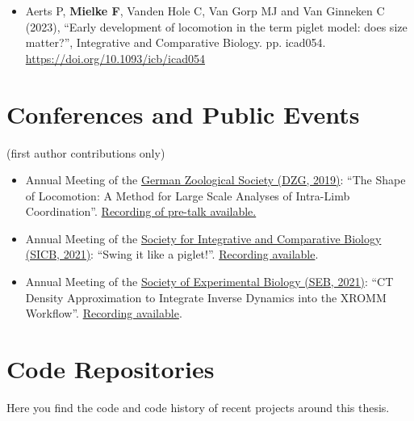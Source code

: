 \begin{change}
\begin{itemize}
\item Aerts P, \textbf{Mielke F}, Vanden Hole C, Van Gorp MJ and Van Ginneken C (2023), ``Early development of locomotion in the term piglet model: does size matter?'', Integrative and Comparative Biology. pp. icad054. \url{https://doi.org/10.1093/icb/icad054}
\end{itemize}
\section{Conferences and Public Events}
\label{sec:orga23c631}
(first author contributions only)

\begin{itemize}
\item Annual Meeting of the \href{https://www.dzg-ev.de/veranstaltungen/jahrestagungen}{German Zoological Society (DZG, 2019)}: ``The Shape of Locomotion: A Method for Large Scale Analyses of Intra-Limb Coordination''. \href{http://mielke-bio.info/falk/posts/05.dzg}{Recording of pre-talk available.}

\item Annual Meeting of the \href{https://sicb.org/meetings/sicb-annual-meeting-2021/}{Society for Integrative and Comparative Biology (SICB, 2021)}: ``Swing it like a piglet!''. \href{http://mielke-bio.info/falk/posts/29.sicb2021}{Recording available}.

\item Annual Meeting of the \href{https://www.sebiology.org/resource/seb-2021-annual-conference.html}{Society of Experimental Biology (SEB, 2021)}: ``CT Density Approximation to Integrate Inverse Dynamics into the XROMM Workflow''. \href{http://mielke-bio.info/falk/posts/26.seb2021}{Recording available}.
\end{itemize}
\section{Code Repositories}
\label{sec:org3724bfd}
Here you find the code and code history of recent projects around this thesis.


\end{change}

